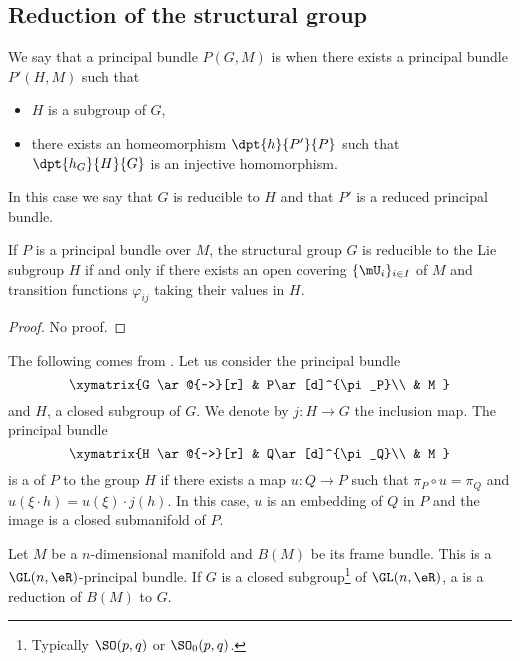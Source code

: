 \subsection{Reduction of the structural group}

We say that a principal bundle $P(G,M)$ is  when there exists a principal bundle $P'(H,M)$ such that 

\begin{itemize}
\item $H$ is a subgroup of $G$,
\item there exists an homeomorphism $\dpt{h}{P'}{P}$ such that $\dpt{h_G}{H}{G}$ is an injective homomorphism.
\end{itemize}

In this case we say that $G$ is reducible to $H$ and that $P'$ is a reduced principal bundle.

\begin{theorem}
If $P$ is a principal bundle over $M$, the structural group $G$ is reducible to the Lie subgroup $H$ if and only if there exists an open covering $\{ \mU_i \}_{i\in I}$ of $M$ and transition functions $\varphi_{ij}$ taking their values in $H$.
\end{theorem}
\begin{proof}
No proof.
\end{proof}
The following comes from \cite{Dieu4}. Let us consider the principal bundle
\begin{equation}
\xymatrix{%
   G \ar@{~>}[r]		&	P\ar[d]^{\pi_P}\\
   				&	M
 }
\end{equation}
and $H$, a closed subgroup of $G$. We denote by $j\colon H\to G$ the inclusion map. The principal bundle
\begin{equation}
\xymatrix{%
   H \ar@{~>}[r]		&	Q\ar[d]^{\pi_Q}\\
   				&	M
 }
\end{equation}
is a  of $P$ to the group $H$ if there exists a map $u\colon Q\to P$ such that $\pi_P\circ u=\pi_Q$ and $u(\xi\cdot h)=u(\xi)\cdot j(h)$. In this case, $u$ is an embedding of $Q$ in $P$ and the image is a closed submanifold of $P$.   

Let $M$ be a $n$-dimensional manifold and $B(M)$ be its frame bundle. This is a $\GL(n,\eR)$-principal bundle. If $G$ is a closed subgroup\footnote{Typically $\SO(p,q)$ or $\SO_0(p,q)$.} of $\GL(n,\eR)$, a  is a reduction of $B(M)$ to $G$.

